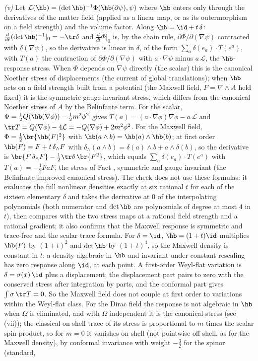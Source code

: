 \emph{(v)} Let $\mathcal{L}(\hb) = (\det\hb)^{-1}\Phi(\hb(\partial\psi), \psi)$ where $\hb$ enters only through the derivatives of the matter field (applied as a linear map, or as its outermorphism on a field strength) and the volume factor. Along $\hb = \id + t\,\delta$: $\frac{d}{dt}(\det\hb)^{-1}|_{0} = -\tr\delta$ and $\frac{d}{dt}\Phi|_{0}$ is, by the chain rule, $\partial\Phi/\partial(\nabla\psi)$ contracted with $\delta(\nabla\psi)$, so the derivative is linear in $\delta$, of the form $\sum_{a} \delta(e_{a}) \cdot T(e^{a})$, with $T(a)$ the contraction of $\partial\Phi/\partial(\nabla\psi)$ with $a \cdot \nabla\psi$ minus $a\,\mathcal{L}$, the $\hb$-response stress. When $\Phi$ depends on $\nabla\psi$ directly (the scalar) this is the canonical Noether stress of displacements (the current of global translations); when $\hb$ acts on a field strength built from a potential (the Maxwell field, $F = \nabla \wedge A$ held fixed) it is the symmetric gauge-invariant stress, which differs from the canonical Noether stress of $A$ by the Belinfante term. For the scalar, $\Phi = \tfrac12 Q(\hb(\nabla\phi)) - \tfrac12 m^{2}\phi^{2}$ gives $T(a) = (a \cdot \nabla\phi)\nabla\phi - a\,\mathcal{L}$ and $\tr T = Q(\nabla\phi) - 4\mathcal{L} = -Q(\nabla\phi) + 2m^{2}\phi^{2}$. For the Maxwell field, $\Phi = \tfrac12\br{\hb(F)^{2}}$ with $\hb(a \wedge b) = \hb(a) \wedge \hb(b)$; at first order $\hb(F) = F + t\,\delta_{\wedge}F$ with $\delta_{\wedge}(a \wedge b) = \delta(a) \wedge b + a \wedge \delta(b)$, so the derivative is $\br{F\,\delta_{\wedge}F} - \tfrac12\tr\delta\,\br{F^{2}}$, which equals $\sum_{a}\delta(e_{a}) \cdot T(e^{a})$ with $T(a) = -\tfrac12 FaF$, the stress of Fact , symmetric and gauge invariant (the Belinfante-improved canonical stress). The check does not use these formulas: it evaluates the full nonlinear densities exactly at six rational $t$ for each of the sixteen elementary $\delta$ and takes the derivative at $0$ of the interpolating polynomials (both numerator and $\det\hb$ are polynomials of degree at most $4$ in $t$), then compares with the two stress maps at a rational field strength and a rational gradient; it also confirms that the Maxwell response is symmetric and trace-free and the scalar trace formula. For $\delta = \id$, $\hb = (1 + t)\id$ multiplies $\hb(F)$ by $(1 + t)^{2}$ and $\det\hb$ by $(1 + t)^{4}$, so the Maxwell density is constant in $t$: a density algebraic in $\hb$ and invariant under constant rescaling has zero response along $\id$, at each point. A first-order Weyl-flat variation is $\delta = \sigma(x)\,\id$ plus a displacement; the displacement part pairs to zero with the conserved stress after integration by parts, and the conformal part gives $\int \sigma\,\tr T = 0$. So the Maxwell field does not couple at first order to variations within the Weyl-flat class. For the Dirac field the response is not algebraic in $\hb$ when $\Omega$ is eliminated, and with $\Omega$ independent it is the canonical stress (see (vii)); the classical on-shell trace of its stress is proportional to $m$ times the scalar spin product, so for $m = 0$ it vanishes on shell (not pointwise off shell, as for the Maxwell density), by conformal invariance with weight $-\tfrac32$ for the spinor (standard, 